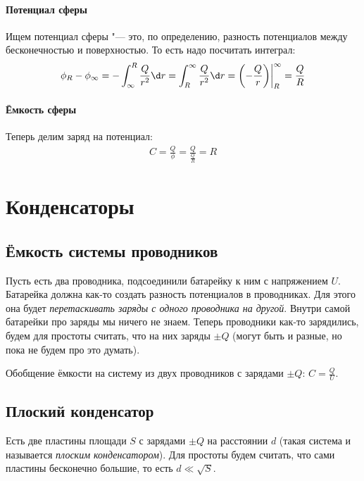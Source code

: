     \subsubsection{Потенциал сферы}
      Ищем потенциал сферы "--- это, по определению, разность потенциалов между  бесконечностью и поверхностью.
      То есть надо посчитать интеграл:
      \begin{gather*}
      \phi_{R} - \phi_{\infty}
        = -\int_{\infty}^{R} \frac{Q}{r^2} \d r
        = \int_{R}^{\infty} \frac{Q}{r^2} \d r
        = \left(-\frac{Q}{r}\right)\biggr|_R^\infty
        = \frac{Q}{R}
      \end{gather*}
    \subsubsection{Ёмкость сферы}
      Теперь делим заряд на потенциал:
      \begin{gather*}
      C = \frac{Q}{\phi} = \frac{Q}{\frac QR} = R
      \end{gather*}

\chapter{Конденсаторы}
\section{Ёмкость системы проводников}
  Пусть есть два проводника, подсоединили батарейку к ним с напряжением $U$.
  Батарейка должна как-то создать разность потенциалов в проводниках.
  Для этого она будет \textit{перетаскивать заряды с одного проводника на другой}.
  Внутри самой батарейки про заряды мы ничего не знаем.
  Теперь проводники как-то зарядились, будем для простоты считать, что на них заряды $\pm Q$
  (могут быть и разные, но пока не будем про это думать).
  \begin{Def}
    Обобщение ёмкости на систему из двух проводников с зарядами $\pm Q$:
    $C=\frac QU$.
  \end{Def}

\section{Плоский конденсатор}
  Есть две пластины площади $S$ с зарядами $\pm Q$ на расстоянии $d$
  (такая система и называется \textit{плоским конденсатором}).
  Для простоты будем считать, что сами пластины бесконечно большие, то есть $d \ll \sqrt S$.

